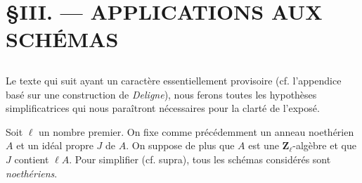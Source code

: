 \chapter*{\S \space III. --- APPLICATIONS AUX SCHÉMAS}\thispagestyle{empty}
\label{ch:3}
\section*{}

Le texte qui suit ayant un caractère essentiellement provisoire (cf. l'appendice basé sur une construction 
de \emph{Deligne}), nous ferons toutes les hypothèses simplificatrices qui nous paraîtront nécessaires 
pour la clarté de l'exposé.

Soit $\ell$ un nombre premier. On fixe comme précédemment un anneau noethérien $A$ et un idéal propre $J$ 
de $A$. On suppose de plus que $A$ est une $\mathbf{Z}_{\ell}$-algèbre et que $J$ contient $\ell A$. 
Pour simplifier (cf. supra), tous les schémas considérés sont \emph{noethériens}.
